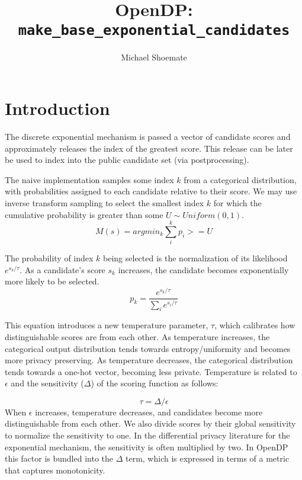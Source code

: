 

\title{OpenDP: \texttt{make\_base\_exponential\_candidates}}
\author{Michael Shoemate}

\maketitle

\section{Introduction}
The discrete exponential mechanism is passed a vector of candidate scores 
and approximately releases the index of the greatest score.
This release can be later be used to index into the public candidate set (via postprocessing).

The naive implementation samples some index $k$ from a categorical distribution, 
with probabilities assigned to each candidate relative to their score.
We may use inverse transform sampling to select the smallest index $k$ for which the cumulative probability is greater than some $U \sim Uniform(0, 1)$.
\begin{equation}
    \label{m-naive}
    M(s) = argmin_k \sum_i^k p_i >= U
\end{equation}

The probability of index $k$ being selected is the normalization of its likelihood $e^{s_k / \tau}$.
As a candidate's score $s_k$ increases, the candidate becomes exponentially more likely to be selected.
\begin{equation}
    \label{prob-of-k}
    p_k = \frac{e^{s_k / \tau}}{\sum_i e^{s_i / \tau}}
\end{equation}

This equation introduces a new temperature parameter, $\tau$, which calibrates how distinguishable scores are from each other.
As temperature increases, the categorical output distribution tends towards entropy/uniformity and becomes more privacy preserving.
As temperature decreases, the categorical distribution tends towards a one-hot vector, becoming less private.
Temperature is related to $\epsilon$ and the sensitivity ($\Delta$) of the scoring function as follows:

\begin{equation}
    \tau = \Delta / \epsilon
\end{equation}
When $\epsilon$ increases, temperature decreases, and candidates become more distinguishable from each other.
We also divide scores by their global sensitivity to normalize the sensitivity to one.
In the differential privacy literature for the exponential mechanism, the sensitivity is often multiplied by two.
In OpenDP this factor is bundled into the $\Delta$ term, which is expressed in terms of a metric that captures monotonicity.

